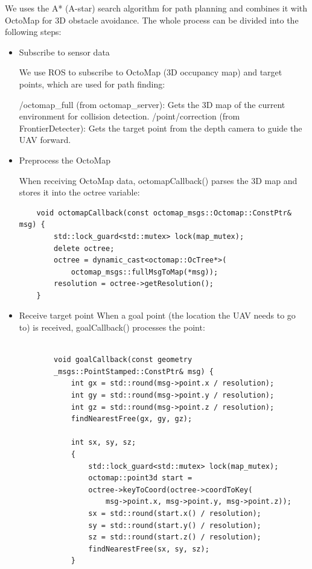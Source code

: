 \documentclass{article}
\begin{document}
We uses the A* (A-star) search algorithm\cite{9986703} for path planning and combines it with OctoMap for 3D obstacle avoidance. The whole process can be divided into the following steps:
\begin{itemize}
    \item Subscribe to sensor data
    
    We use ROS to subscribe to OctoMap (3D occupancy map) and target points, which are used for path finding:

    /octomap\_full (from octomap\_server): Gets the 3D map of the current environment for collision detection.
    /point/correction (from FrontierDetecter): Gets the target point from the depth camera to guide the UAV forward.

    \item Preprocess the OctoMap
    
    When receiving OctoMap data, octomapCallback() parses the 3D map and stores it into the octree variable:
    \begin{lstlisting}
    void octomapCallback(const octomap_msgs::Octomap::ConstPtr& msg) {
        std::lock_guard<std::mutex> lock(map_mutex);
        delete octree;
        octree = dynamic_cast<octomap::OcTree*>(
            octomap_msgs::fullMsgToMap(*msg));
        resolution = octree->getResolution();
    }
    \end{lstlisting}

    \item Receive target point
    When a goal point (the location the UAV needs to go to) is received, goalCallback() processes the point:
    \begin{lstlisting}

        void goalCallback(const geometry
        _msgs::PointStamped::ConstPtr& msg) {
            int gx = std::round(msg->point.x / resolution);
            int gy = std::round(msg->point.y / resolution);
            int gz = std::round(msg->point.z / resolution);
            findNearestFree(gx, gy, gz);  

            int sx, sy, sz;
            {
                std::lock_guard<std::mutex> lock(map_mutex);
                octomap::point3d start = 
                octree->keyToCoord(octree->coordToKey(
                    msg->point.x, msg->point.y, msg->point.z));
                sx = std::round(start.x() / resolution);
                sy = std::round(start.y() / resolution);
                sz = std::round(start.z() / resolution);
                findNearestFree(sx, sy, sz);  
            }


\end{lstlisting}
\end{itemize}
\end{document}
